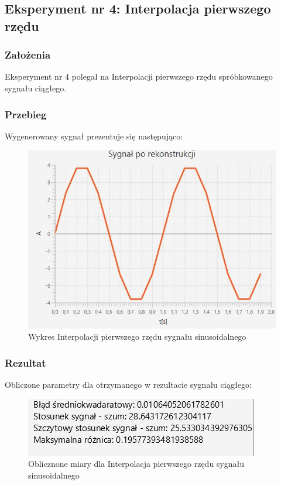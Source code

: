 \documentclass[12pt]{article}
\begin{document}

\newpage
\subsection{Eksperyment nr 4: Interpolacja pierwszego rzędu}

\subsubsection{Założenia}
Eksperyment nr 4 polegał na Interpolacji pierwszego rzędu spróbkowanego sygnału ciągłego.
\subsubsection{Przebieg}
Wygenerowany sygnał prezentuje się następująco:
\begin{figure}[H]
	\centering
	\includegraphics[width=\linewidth]{sygnal_interpolacja_pierwszy.jpg}
	\caption{Wykres Interpolacji pierwszego rzędu sygnału sinusoidalnego}
	\label{wykres dla eksperymentu 4}
\end{figure}



\subsubsection{Rezultat}
Obliczone parametry dla otrzymanego w rezultacie sygnału ciągłego:
\begin{figure}[H]
	\centering
	\includegraphics[width=\linewidth]{wyniki_interpolacja_pierwszy.jpg}
	\caption{Oblicznone miary dla Interpolacja pierwszego rzędu sygnału sinusoidalnego}
	\label{wartości dla eksperymentu 4}
\end{figure}
\end{document}
